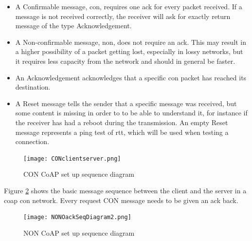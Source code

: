 
\begin{itemize}
	\item A Confirmable message, \gls{con}, requires one \gls{ack} for every packet received. If a message is not received correctly, the receiver will ask for exactly return message of the type Acknowledgement. 
	\item A Non-confirmable message, \gls{non}, does not require an \gls{ack}. This may result in a higher possibility of a packet getting lost, especially in lossy networks, but it requires less capacity from the network and should in general be faster. 
	\item An Acknowledgement acknowledges that a specific \gls{con} packet has reached its destination. 
	\item A Reset message tells the sender that a specific message was received, but some content is missing in order to to be able to understand it, for instance if the receiver has had a reboot during the transmission. An empty Reset message represents a ping test of \gls{rtt}, which will be used when testing a connection. 
\end{itemize}
       



\begin{figure}[ht]
    \centering
    \texttt{[image: CONclientserver.png]}    
    \caption{CON CoAP set up sequence diagram}
    \label{fig:CONclientserver}
\end{figure}

\noindent Figure \ref{fig:NONOackSeqDiagram} shows the basic message sequence between the client and the server in a \gls{coap} \gls{con} network. Every request CON message needs to be given an \gls{ack} back. 

\begin{figure}[ht]
    \centering
    \texttt{[image: NONOackSeqDiagram2.png]}    
    \caption{NON CoAP set up sequence diagram}
    \label{fig:NONOackSeqDiagram}
\end{figure}


